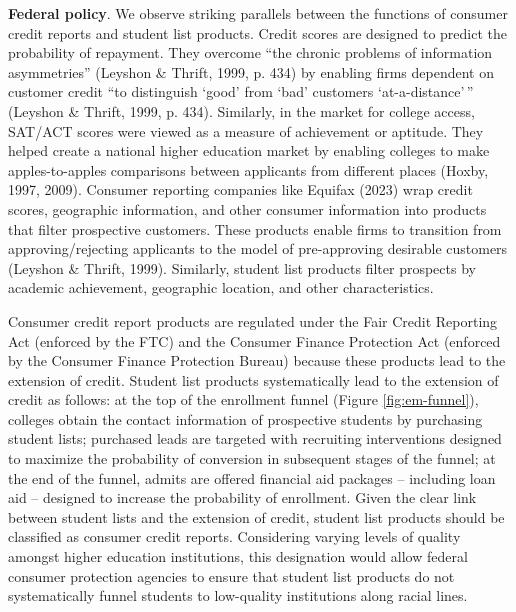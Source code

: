 \documentclass[
  12pt,
]{article}
\begin{document}
\textbf{Federal policy}. We observe striking parallels between the functions of consumer credit reports and student list products. Credit scores are designed to predict the probability of repayment. They overcome ``the chronic problems of information asymmetries'' (Leyshon \& Thrift, 1999, p. 434) by enabling firms dependent on customer credit ``to distinguish `good' from `bad' customers `at-a-distance'\,'' (Leyshon \& Thrift, 1999, p. 434). Similarly, in the market for college access, SAT/ACT scores were viewed as a measure of achievement or aptitude. They helped create a national higher education market by enabling colleges to make apples-to-apples comparisons between applicants from different places (Hoxby, 1997, 2009). Consumer reporting companies like Equifax (2023) wrap credit scores, geographic information, and other consumer information into products that filter prospective customers. These products enable firms to transition from approving/rejecting applicants to the model of pre-approving desirable customers (Leyshon \& Thrift, 1999). Similarly, student list products filter prospects by academic achievement, geographic location, and other characteristics.

Consumer credit report products are regulated under the Fair Credit Reporting Act (enforced by the FTC) and the Consumer Finance Protection Act (enforced by the Consumer Finance Protection Bureau) because these products lead to the extension of credit. Student list products systematically lead to the extension of credit as follows: at the top of the enrollment funnel (Figure \ref{fig:em-funnel}), colleges obtain the contact information of prospective students by purchasing student lists; purchased leads are targeted with recruiting interventions designed to maximize the probability of conversion in subsequent stages of the funnel; at the end of the funnel, admits are offered financial aid packages -- including loan aid -- designed to increase the probability of enrollment. Given the clear link between student lists and the extension of credit, student list products should be classified as consumer credit reports. Considering varying levels of quality amongst higher education institutions, this designation would allow federal consumer protection agencies to ensure that student list products do not systematically funnel students to low-quality institutions along racial lines.
\end{document}
